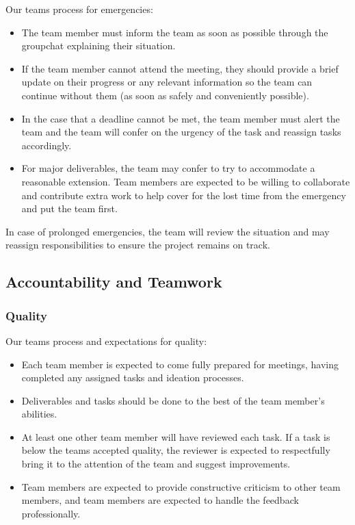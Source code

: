 \documentclass{article}
\begin{document}
Our teams process for emergencies:
\begin{itemize}
    \item The team member must inform the team as soon as possible through the groupchat explaining their situation.
    \item If the team member cannot attend the meeting, they should provide a brief update on their progress or any relevant information so the team can continue without them (as soon as safely and conveniently possible).
    \item In the case that a deadline cannot be met, the team member must alert the team and the team will confer on the urgency of the task and reassign tasks accordingly.
    \item For major deliverables, the team may confer to try to accommodate a reasonable extension. Team members are expected to be willing to collaborate and contribute extra work to help cover for the lost time from the emergency and put the team first.
    
\end{itemize}
In case of prolonged emergencies, the team will review the situation and may reassign responsibilities to ensure the project remains on track.


\subsection*{Accountability and Teamwork}

\subsubsection*{Quality} 

Our teams process and expectations for quality:
\begin{itemize}
    \item Each team member is expected to come fully prepared for meetings, having completed any assigned tasks and ideation processes. 
    \item Deliverables and tasks should be done to the best of the team member's abilities.
    \item At least one other team member will have reviewed each task. If a task is below the teams accepted quality, the reviewer is expected to respectfully bring it to the attention of the team and suggest improvements.
    \item Team members are expected to provide constructive criticism to other team members, and team members are expected to handle the feedback professionally. 
\end{itemize}
\end{document}
